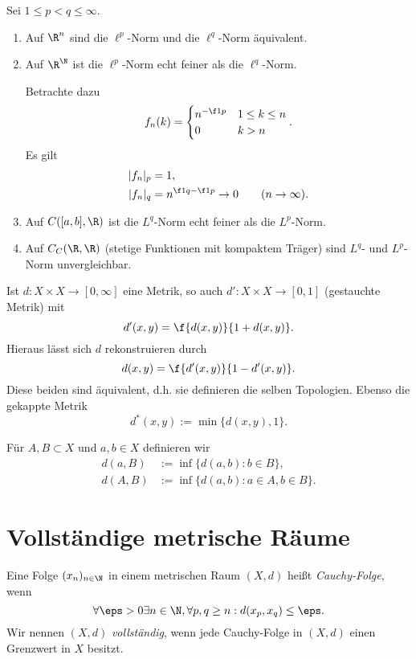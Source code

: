 \begin{ex}
	Sei $1 \le p < q \le \infty$.
	\begin{enumerate}[(1)]
		\item
			Auf $\R^n$ sind die $\ell^p$-Norm und die $\ell^q$-Norm äquivalent.
		\item
			Auf $\R^\N$ ist die $\ell^p$-Norm echt feiner als die $\ell^q$-Norm.

			Betrachte dazu
			\[
				f_n(k) = \begin{cases}
					n^{-\f 1p} & 1 \le k \le n \\
					0 & k > n
				\end{cases}.
			\]
			Es gilt
			\begin{align*}
				|f_n|_p &= 1, \\
				|f_n|_q &= n^{\f 1q-\f 1p} \to 0 \qquad (n\to \infty).
			\end{align*}
		\item
			Auf $C([a,b], \R)$ ist die $L^q$-Norm echt feiner als die $L^p$-Norm.
		\item
			Auf $C_C(\R,\R)$ (stetige Funktionen mit kompaktem Träger) sind $L^q$- und $L^p$-Norm unvergleichbar.
	\end{enumerate}
\end{ex}

\begin{ex}
	Ist $d: X \times X \to [0,\infty]$ eine Metrik, so auch $d': X \times X \to [0,1]$ (gestauchte Metrik) mit
	\[
		d'(x,y) = \f {d(x,y)}{1 + d(x,y)}.
	\]
	Hieraus lässt sich $d$ rekonstruieren durch
	\[
		d(x,y) = \f {d'(x,y)}{1-d'(x,y)}.
	\]
	Diese beiden sind äquivalent, d.h. sie definieren die selben Topologien.
	Ebenso die gekappte Metrik
	\[
		d^*(x,y) := \min \{d(x,y), 1 \}.
	\]
\end{ex}


Für $A, B \subset X$ und $a,b \in X$ definieren wir
\begin{align*}
	d(a,B)
		&:= \inf \{ d(a,b) : b \in B \}, \\
	d(A,B)
		&:= \inf \{ d(a,b) : a \in A, b \in B \}.
\end{align*}


\section{Vollständige metrische Räume}


\begin{df}
	Eine Folge $(x_n)_{n\in \N}$ in einem metrischen Raum $(X,d)$ heißt \emph{Cauchy-Folge}, wenn
	\[
		\forall \eps > 0 \exists n \in \N, \forall p,q \ge n : d(x_p,x_q) \le \eps.
	\]
	Wir nennen $(X,d)$ \emph{vollständig}, wenn jede Cauchy-Folge in $(X,d)$ einen Grenzwert in $X$ besitzt.
\end{df}

